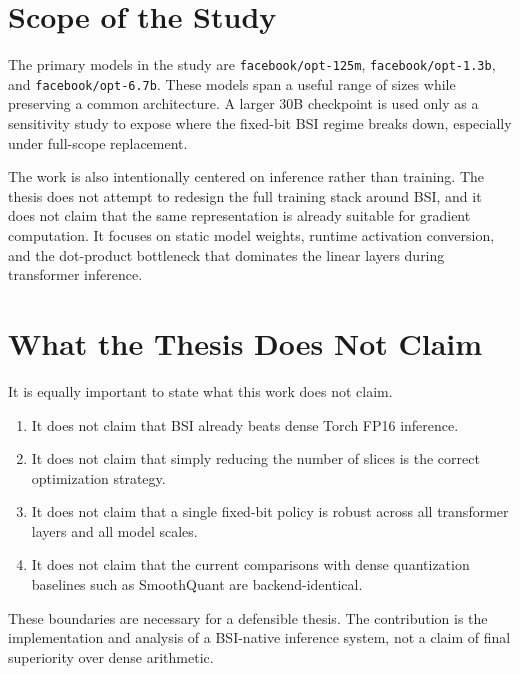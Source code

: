 \section{Scope of the Study}
The primary models in the study are \texttt{facebook/opt-125m}, \texttt{facebook/opt-1.3b}, and \texttt{facebook/opt-6.7b}. These models span a useful range of sizes while preserving a common architecture. A larger 30B checkpoint is used only as a sensitivity study to expose where the fixed-bit BSI regime breaks down, especially under full-scope replacement.

The work is also intentionally centered on inference rather than training. The thesis does not attempt to redesign the full training stack around BSI, and it does not claim that the same representation is already suitable for gradient computation. It focuses on static model weights, runtime activation conversion, and the dot-product bottleneck that dominates the linear layers during transformer inference.

\section{What the Thesis Does Not Claim}
It is equally important to state what this work does not claim.

\begin{enumerate}[leftmargin=2em]
\item It does not claim that BSI already beats dense Torch FP16 inference.
\item It does not claim that simply reducing the number of slices is the correct optimization strategy.
\item It does not claim that a single fixed-bit policy is robust across all transformer layers and all model scales.
\item It does not claim that the current comparisons with dense quantization baselines such as SmoothQuant are backend-identical.
\end{enumerate}

These boundaries are necessary for a defensible thesis. The contribution is the implementation and analysis of a BSI-native inference system, not a claim of final superiority over dense arithmetic.
